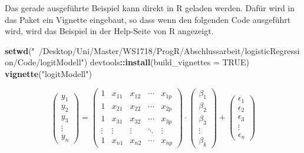 \documentclass[12pt,]{article}
\newenvironment{Shaded}{\begin{snugshade}}{\end{snugshade}}
\newcommand{\KeywordTok}[1]{\textcolor[rgb]{0.13,0.29,0.53}{\textbf{#1}}}
\newcommand{\DataTypeTok}[1]{\textcolor[rgb]{0.13,0.29,0.53}{#1}}
\newcommand{\StringTok}[1]{\textcolor[rgb]{0.31,0.60,0.02}{#1}}
\newcommand{\OtherTok}[1]{\textcolor[rgb]{0.56,0.35,0.01}{#1}}
\newcommand{\OperatorTok}[1]{\textcolor[rgb]{0.81,0.36,0.00}{\textbf{#1}}}
\newcommand{\NormalTok}[1]{#1}
\begin{document}
Das gerade ausgeführte Beispiel kann direkt in R geladen werden. Dafür
wird in das Paket ein Vignette eingebaut, so dass wenn den folgenden
Code ausgeführt wird, wird das Beispiel in der Help-Seite von R
angezeigt.

\begin{Shaded}
\begin{Highlighting}[]
\KeywordTok{setwd}\NormalTok{(}\StringTok{"~/Desktop/Uni/Master/WS1718/ProgR/Abschlussarbeit/logisticRegression/Code/logitModell"}\NormalTok{)}
\NormalTok{devtools}\OperatorTok{::}\KeywordTok{install}\NormalTok{(}\DataTypeTok{build_vignettes =} \OtherTok{TRUE}\NormalTok{)}
\KeywordTok{vignette}\NormalTok{(}\StringTok{"logitModell"}\NormalTok{)}
\end{Highlighting}
\end{Shaded}

\[
\begin{pmatrix}
    y_1 \\ y_2 \\ y_3 \\ \vdots \\ y_n 
 \end{pmatrix} = 
 \begin{pmatrix}
    1 & x_{11} & x_{12} & \cdots & x_{1p} \\
    1 & x_{21} & x_{22} & \cdots & x_{2p} \\
    1 & x_{31} & x_{32} & \cdots & x_{3p} \\
    \vdots  & \vdots  & \vdots & \ddots & \vdots \\
    1 & x_{n1} & x_{n2} & \cdots & x_{np}
 \end{pmatrix} \cdot
 \begin{pmatrix}
    \beta_1 \\ \beta_2 \\ \beta_3 \\ \vdots \\ \beta_k  
 \end{pmatrix} +
 \begin{pmatrix}
    \epsilon_1 \\ \epsilon_2 \\ \epsilon_3 \\ \vdots \\ \epsilon_n  
 \end{pmatrix}
\]
\end{document}
